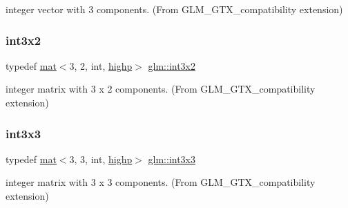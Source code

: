 integer vector with 3 components. (From G\+L\+M\+\_\+\+G\+T\+X\+\_\+compatibility extension) 

\mbox{\label{group__gtx__compatibility_ga3e01f29f95467e49bdfd1b000420d13e}} 
\subsubsection{\texorpdfstring{int3x2}{int3x2}}
{\footnotesize\ttfamily typedef \hyperlink{structglm_1_1mat}{mat}$<$3, 2, int, \hyperlink{namespaceglm_a36ed105b07c7746804d7fdc7cc90ff25ac6f7eab42eacbb10d59a58e95e362074}{highp}$>$ \hyperlink{group__gtx__compatibility_ga3e01f29f95467e49bdfd1b000420d13e}{glm\+::int3x2}}



integer matrix with 3 x 2 components. (From G\+L\+M\+\_\+\+G\+T\+X\+\_\+compatibility extension) 

\mbox{\label{group__gtx__compatibility_gac7c574e682731013783283d875602224}} 
\subsubsection{\texorpdfstring{int3x3}{int3x3}}
{\footnotesize\ttfamily typedef \hyperlink{structglm_1_1mat}{mat}$<$3, 3, int, \hyperlink{namespaceglm_a36ed105b07c7746804d7fdc7cc90ff25ac6f7eab42eacbb10d59a58e95e362074}{highp}$>$ \hyperlink{group__gtx__compatibility_gac7c574e682731013783283d875602224}{glm\+::int3x3}}



integer matrix with 3 x 3 components. (From G\+L\+M\+\_\+\+G\+T\+X\+\_\+compatibility extension) 

\mbox{\label{group__gtx__compatibility_gaaf72af875fd64f43606aa083d2374195}} 
